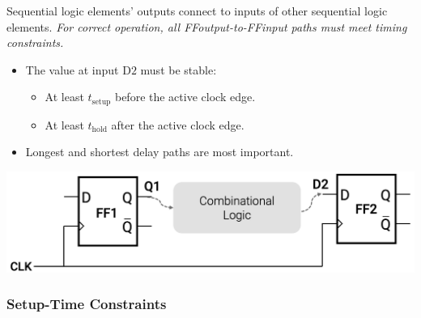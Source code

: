 \documentclass[12pt,openany]{book}
\begin{document}
 Sequential logic elements' outputs connect to inputs of other sequential logic elements. \newline \textit{For correct operation, all FFoutput-to-FFinput paths must meet timing constraints.}
 \begin{center}
	\hspace{-0.07\textwidth}
	\begin{minipage}{0.6\textwidth}
		\begin{itemize}
		    \item[] The value at input \( \text{D2} \) must be stable:
		    \begin{itemize}
		        \item At least \( t_{\text{setup}} \) before the active clock edge.
		        \item At least \( t_{\text{hold}} \) after the active clock edge.
		    \end{itemize}
		    \item[] Longest and shortest delay paths are most important.
		\end{itemize}
	\end{minipage}
\hfill	
\hspace{-0.05\textwidth}
\begin{minipage}{0.4\textwidth}
		\includegraphics[width=1.3\textwidth]{circuits/15.1.2.png}
	\end{minipage}
\end{center}


\subsubsection{Setup-Time Constraints}
\end{document}
